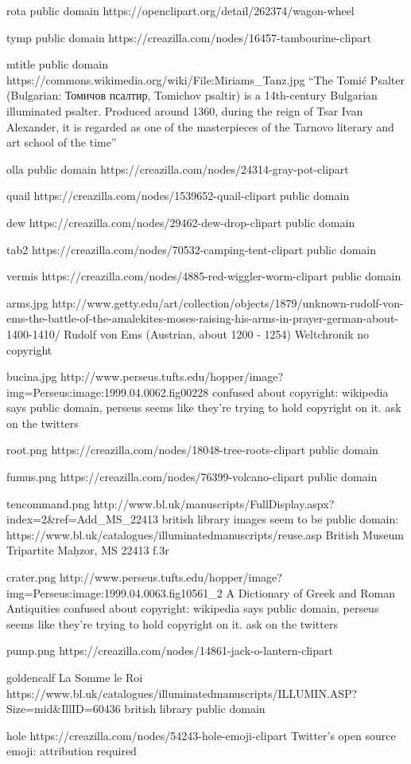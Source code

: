 rota
public domain
https://openclipart.org/detail/262374/wagon-wheel

tymp
public domain
https://creazilla.com/nodes/16457-tambourine-clipart

mtitle
public domain
https://commons.wikimedia.org/wiki/File:Miriams_Tanz.jpg
``The Tomić Psalter (Bulgarian: Томичов псалтир, Tomichov psaltir) is a 14th-century Bulgarian illuminated psalter. Produced around 1360, during the reign of Tsar Ivan Alexander, it is regarded as one of the masterpieces of the Tarnovo literary and art school of the time''

olla
public domain
https://creazilla.com/nodes/24314-gray-pot-clipart

quail
https://creazilla.com/nodes/1539652-quail-clipart
public domain

dew
https://creazilla.com/nodes/29462-dew-drop-clipart
public domain

tab2
https://creazilla.com/nodes/70532-camping-tent-clipart
public domain

vermis
https://creazilla.com/nodes/4885-red-wiggler-worm-clipart
public domain

arms.jpg
http://www.getty.edu/art/collection/objects/1879/unknown-rudolf-von-ems-the-battle-of-the-amalekites-moses-raising-his-arms-in-prayer-german-about-1400-1410/
Rudolf von Ems (Austrian, about 1200 - 1254)
Weltchronik
no copyright

bucina.jpg
http://www.perseus.tufts.edu/hopper/image?img=Perseus:image:1999.04.0062.fig00228
confused about copyright: wikipedia says public domain, perseus seems like they're trying to hold copyright on it.
ask on the twitters

root.png
https://creazilla.com/nodes/18048-tree-roots-clipart
public domain

fumus.png
https://creazilla.com/nodes/76399-volcano-clipart
public domain

tencommand.png
http://www.bl.uk/manuscripts/FullDisplay.aspx?index=2&ref=Add_MS_22413
british library images seem to be public domain: https://www.bl.uk/catalogues/illuminatedmanuscripts/reuse.asp
British Museum Tripartite Maḥzor, MS 22413 f.3r 

crater.png
http://www.perseus.tufts.edu/hopper/image?img=Perseus:image:1999.04.0063.fig10561_2
A Dictionary of Greek and Roman Antiquities
confused about copyright: wikipedia says public domain, perseus seems like they're trying to hold copyright on it.
ask on the twitters

pump.png
https://creazilla.com/nodes/14861-jack-o-lantern-clipart

goldencalf
La Somme le Roi
https://www.bl.uk/catalogues/illuminatedmanuscripts/ILLUMIN.ASP?Size=mid&IllID=60436
british library public domain 

hole
https://creazilla.com/nodes/54243-hole-emoji-clipart
Twitter’s open source emoji: attribution required
